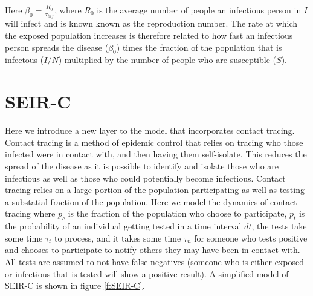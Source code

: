 \documentclass[notitlepage, superscriptaddress]{revtex4-2}
\begin{document}
Here $\beta_0 = \frac{R_{0}}{\tau_{inf}}$, where $R_{0}$ is the average number of people an infectious person in $I$ will infect and is known known as the reproduction number. The rate at which the exposed population increases is therefore related to how fast an infectious person spreads the disease ($\beta_{0}$) times the fraction of the population that is infectous ($I/N$) multiplied by the number of people who are susceptible ($S$).

\section{SEIR-C}
Here we introduce a new layer to the model that incorporates contact tracing. Contact tracing is a method of epidemic control that relies on tracing who those infected were in contact with, and then having them self-isolate. This reduces the spread of the disease as it is possible to identify and isolate those who are infectious as well as those who could potentially become infectious. Contact tracing relies on a large portion of the population participating as well as testing a substatial fraction of the population. Here we model the dynamics of contact tracing where $p_{c}$ is the fraction of the population who choose to participate, $p_t$ is the probability of an individual getting tested in a time interval $dt$, the tests take some time $\tau_{t}$ to process, and it takes some time $\tau_{n}$ for someone who tests positive and chooses to participate to notify others they may have been in contact with. All tests are assumed to not have false negatives (someone who is either exposed or infectious that is tested will show a positive result). A simplified model of SEIR-C is shown in figure \ref{f:SEIR-C}.
\end{document}
